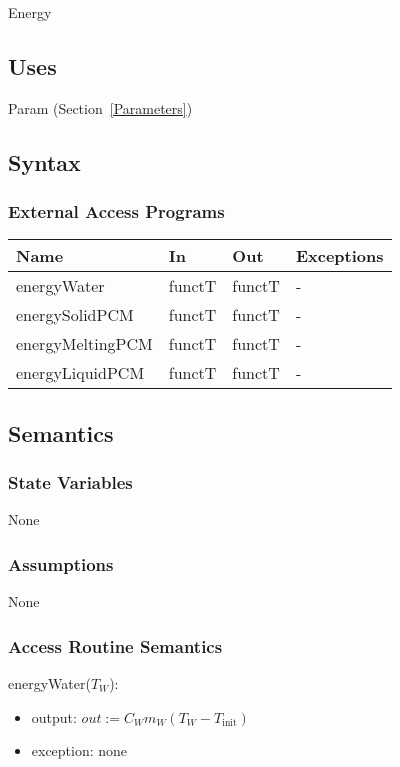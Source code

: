 \documentclass[12pt]{article}
\begin{document}
Energy

\subsection{Uses}

Param (Section~\ref{Parameters})

\subsection{Syntax}

\subsubsection{External Access Programs}

\begin{center}
\begin{tabular}{p{4cm} p{4cm} p{3cm} p{2cm}}
\hline
\textbf{Name} & \textbf{In} & \textbf{Out} & \textbf{Exceptions} \\
\hline
energyWater & functT & functT & - \\
\hline
energySolidPCM & functT & functT & - \\
\hline
energyMeltingPCM & functT & functT & - \\
\hline
energyLiquidPCM & functT & functT & - \\
\hline
\end{tabular}
\end{center}

\subsection{Semantics}

\subsubsection{State Variables}

None

\subsubsection{Assumptions}

None

\subsubsection{Access Routine Semantics}

energyWater($T_W$): 
\renewcommand*{\arraystretch}{1.5}
\begin{itemize}
\item output: $out := C_W m_W (T_W - T_\text{init})$
\item exception: none
\end{itemize}
\end{document}
